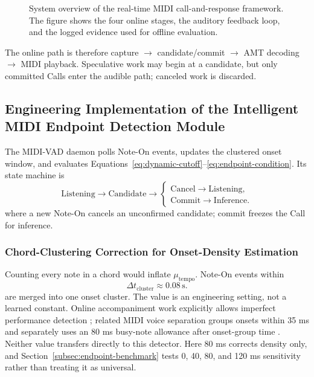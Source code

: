\documentclass[11pt,a4paper]{article}
\begin{document}
\begin{figure}[H]
\caption{System overview of the real-time MIDI call-and-response framework. The figure shows the four online stages, the auditory feedback loop, and the logged evidence used for offline evaluation.}
\label{fig:System_overview}
\end{figure}

The online path is therefore capture $\rightarrow$ candidate/commit $\rightarrow$ AMT decoding $\rightarrow$ MIDI playback. Speculative work may begin at a candidate, but only committed Calls enter the audible path; canceled work is discarded.

\subsection{Engineering Implementation of the Intelligent MIDI Endpoint Detection Module}
\label{sec:midi-vad-engineering}

The MIDI-VAD daemon polls Note-On events, updates the clustered onset window, and evaluates Equations~\eqref{eq:dynamic-cutoff}--\eqref{eq:endpoint-condition}. Its state machine is
\begin{equation}
\text{Listening}
\rightarrow
\text{Candidate}
\rightarrow
\begin{cases}
\text{Cancel} \rightarrow \text{Listening},\\
\text{Commit} \rightarrow \text{Inference}.
\end{cases}
\label{eq:midi-vad-state-machine}
\end{equation}
where a new Note-On cancels an unconfirmed candidate; commit freezes the Call for inference.

\subsubsection{Chord-Clustering Correction for Onset-Density Estimation}

Counting every note in a chord would inflate $\mu_{\mathrm{tempo}}$. Note-On events within
\begin{equation}
\Delta t_{\mathrm{cluster}} \approx 0.08\,\mathrm{s}.
\label{eq:cluster-window}
\end{equation}
are merged into one onset cluster. The value is an engineering setting, not a learned constant. Online accompaniment work explicitly allows imperfect performance detection \citep{dannenberg1984online}; related MIDI voice separation groups onsets within 35 ms and separately uses an 80 ms busy-note allowance after onset-group time \citep{madsen2006separating}. Neither value transfers directly to this detector. Here 80 ms corrects density only, and Section~\ref{subsec:endpoint-benchmark} tests 0, 40, 80, and 120 ms sensitivity rather than treating it as universal.
\end{document}
